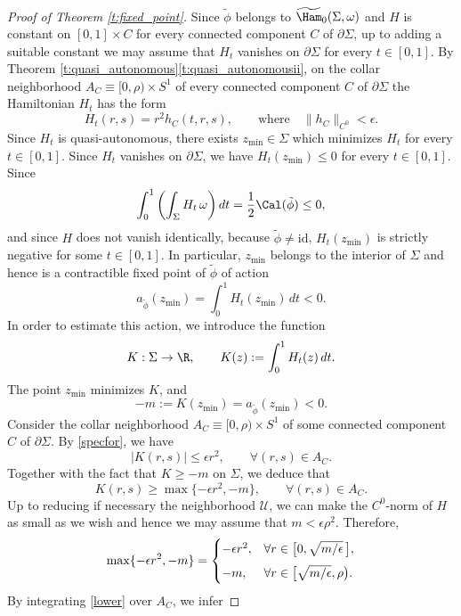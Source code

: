 \begin{proof}[Proof of Theorem \ref{t:fixed_point}]
Since $\tilde{\phi}$ belongs to $\widetilde{\Ham}_0(\Sigma,\omega)$ and $H$ is constant on $[0,1]\times C$ for every connected component $C$ of $\partial \Sigma$, up to adding a suitable constant we may assume that $H_t$ vanishes on $\partial \Sigma$ for every $t\in [0,1]$. By Theorem \ref{t:quasi_autonomous}\eqref{t:quasi_autonomousii}, on the collar neighborhood $A_C \equiv [0,\rho) \times S^1$ of every connected component $C$ of $\partial \Sigma$ the Hamiltonian $H_t$ has the form
\begin{equation}
\label{specfor}
H_t(r,s) = r^2 h_C(t,r,s), \qquad \mbox{where} \quad \|h_C\|_{C^0} < \epsilon.
\end{equation}
Since $H_t$ is quasi-autonomous, there exists $z_{\min}\in \Sigma$ which minimizes $H_t$ for every $t\in [0,1]$. Since $H_t$ vanishes on $\partial \Sigma$, we have $H_t(z_{\min}) \leq 0$ for every $t\in [0,1]$. Since
\[
\int_0^1 \left( \int_{\Sigma} H_t \, \omega \right) dt = \frac{1}{2} \Cal(\tilde{\phi}) \leq 0,
\]
and since $H$ does not vanish identically, because $\tilde{\phi} \neq \mathrm{id}$, $H_t(z_{\min})$ is strictly negative for some $t\in[0,1]$. In particular, $z_{\min}$ belongs to the interior of $\Sigma$ and hence is a contractible fixed point of $\tilde{\phi}$ of action
\[
a_{\tilde{\phi}}(z_{\min}) = \int_0^1 H_t(z_{\min})\, dt<0.
\]
In order to estimate this action, we introduce the function
\[
K: \Sigma\to \R, \qquad K(z):= \int_0^1 H_t(z)\, dt.
\]
The point $z_{\min}$ minimizes $K$, and
\[
-m:= K(z_{\min}) = a_{\tilde{\phi}}(z_{\min})<0.
\]
Consider the collar neighborhood $A_C\equiv [0,\rho) \times S^1$ of some connected component $C$ of $\partial \Sigma$. By \eqref{specfor}, we have
\[
|K(r,s)| \leq \epsilon r^2, \qquad \forall (r,s)\in A_C.
\]
Together with the fact that $K\geq -m$ on $\Sigma$, we deduce that
\begin{equation}
\label{lower}
K(r,s) \geq \max\{ -\epsilon r^2 , -m\},
\qquad \forall (r,s)\in A_C.
\end{equation}
Up to reducing if necessary the neighborhood $\mathcal{U}$, we can make the $C^0$-norm of $H$ as small as we wish and hence we may assume that $m< \epsilon \rho^2$. Therefore,
\[
\max\{ -\epsilon r^2 , -m\} =
\begin{cases}
- \epsilon r^2 , & \forall r\in \bigl[ 0,\sqrt{m/\epsilon}\, \bigr],\vspace{5pt}\\
-m, & \forall r\in \bigl[ \sqrt{m/\epsilon}, \rho \bigr).
\end{cases}
\]
By integrating \eqref{lower} over $A_C$, we infer

\end{proof}

